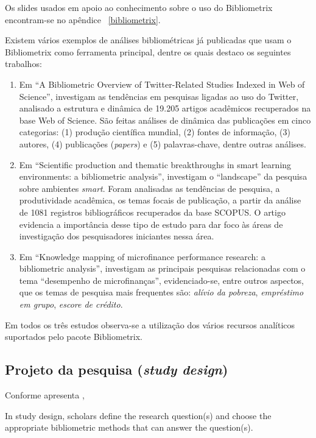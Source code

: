 Os slides usados em apoio ao conhecimento sobre o uso do Bibliometrix encontram-se no apêndice ~\ref{bibliometrix}.

Existem vários exemplos de análises bibliométricas já publicadas que usam o Bibliometrix como ferramenta principal, dentre os quais destaco os seguintes trabalhos:
\begin{enumerate}
    \item Em ``A Bibliometric Overview of Twitter-Related Studies Indexed in Web of Science'', \cite{yu_bibliometric_2020} investigam as tendências em pesquisas ligadas ao uso do Twitter, analisado a estrutura e dinâmica de 19.205 artigos acadêmicos recuperados na base Web of Science. São feitas análises de dinâmica das publicações em cinco categorias: (1) produção científica mundial, (2) fontes de informação, (3) autores, (4) publicações (\textit{papers}) e (5) palavras-chave, dentre outras análises.
    \item Em ``Scientific production and thematic breakthroughs in smart learning environments: a bibliometric analysis'', \cite{agbo_scientific_2021} investigam o ``landscape'' da pesquisa sobre ambientes \textit{smart}. Foram analisadas as tendências de pesquisa, a produtividade acadêmica, os temas focais de publicação, a partir da análise de 1081 registros bibliográficos recuperados da base SCOPUS. O artigo evidencia a importância desse tipo de estudo para dar foco às áreas de investigação dos pesquisadores iniciantes nessa área.
    \item Em ``Knowledge mapping of microfinance performance research: a bibliometric analysis'', \cite{akter_knowledge_2021} investigam as principais pesquisas relacionadas com o tema  ``desempenho de microfinanças'', evidenciado-se, entre outros aspectos, que os temas de pesquisa mais frequentes são: \textit{alívio da pobreza}, \textit{empréstimo em grupo}, \textit{escore de crédito}.
\end{enumerate}

Em todos os três estudos observa-se a utilização dos vários recursos analíticos suportados pelo pacote Bibliometrix.

\subsection{Projeto da pesquisa (\textit{study design})} 

Conforme apresenta \cite[p. 960]{aria_bibliometrix_2017},

\begin{itquote}
    In study design, scholars define the research question(s) and choose the appropriate bibliometric methods that can
answer the question(s).
\end{itquote}


